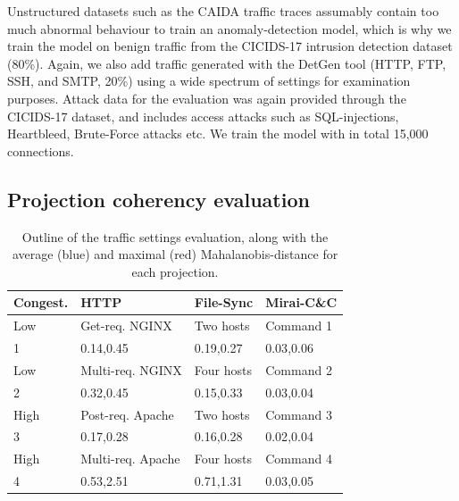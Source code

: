 \documentclass[conference]{IEEEtran}
\begin{document}
Unstructured datasets such as the CAIDA traffic traces assumably contain too much abnormal behaviour to train an anomaly-detection model, which is why we train the model on benign traffic from the CICIDS-17 intrusion detection dataset (80\%). Again, we also add traffic generated with the DetGen tool (HTTP, FTP, SSH, and SMTP, 20\%) using a wide spectrum of settings for examination purposes. Attack data for the evaluation was again provided through the CICIDS-17 dataset, and includes access attacks such as SQL-injections, Heartbleed, Brute-Force attacks etc. We  train the model with in total 15,000 connections.

\subsection{Projection coherency evaluation}

\begin{table}
\centering
\begin{tabular}{p{1cm}|p{2.3cm}|p{1.5cm}|p{1.6cm}}
Congest.&HTTP&File-Sync & Mirai-C\&C\\ \hline 
Low& Get-req. NGINX&  Two hosts & Command 1 \vspace{0.1cm} \\ \hline
1& \textcolor{myblue}{0.14}\space ,\space\space\textcolor{myred}{0.45} 
&\textcolor{myblue}{0.19}\space ,\space\space\textcolor{myred}{0.27} 
&\textcolor{myblue}{0.03}\space ,\space\space\textcolor{myred}{0.06}\\ \hline \hline
Low&Multi-req. NGINX & Four hosts & Command 2\\ \hline
2&\textcolor{myblue}{0.32}\space ,\space\space\textcolor{myred}{0.45} 
&\textcolor{myblue}{0.15}\space ,\space\space\textcolor{myred}{0.33} 
&\textcolor{myblue}{0.03}\space ,\space\space\textcolor{myred}{0.04}\\ \hline \hline
High& Post-req. Apache &Two hosts & Command 3\\ \hline
3&\textcolor{myblue}{0.17}\space ,\space\space\textcolor{myred}{0.28} 
&\textcolor{myblue}{0.16}\space ,\space\space\textcolor{myred}{0.28} 
&\textcolor{myblue}{0.02}\space ,\space\space\textcolor{myred}{0.04}\\ \hline \hline
High& Multi-req. Apache & Four hosts & Command 4\\ \hline
4&\textcolor{myblue}{0.53}\space ,\space\space\textcolor{myred}{2.51} 
&\textcolor{myblue}{0.71}\space ,\space\space\textcolor{myred}{1.31} 
&\textcolor{myblue}{0.03}\space ,\space\space\textcolor{myred}{0.05}\\ \hline \hline
\end{tabular}
\caption{Outline of the traffic settings evaluation, along with the average (blue) and maximal (red) Mahalanobis-distance for each projection.}\label{Tab:Dataset}
\end{table}
\end{document}
